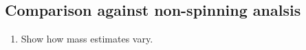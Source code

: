 \subsection{Comparison against non-spinning analsis}

\begin{enumerate}
\item Show how mass estimates vary.
\end{enumerate}
